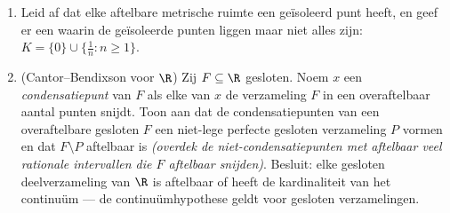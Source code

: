 \begin{problem}
\begin{enumerate}[resume]
        perfectheid.
  \item Leid af dat elke aftelbare  metrische ruimte een
        geïsoleerd punt heeft, en geef er een waarin de
        geïsoleerde punten  liggen maar niet alles zijn: $K =
        \{0\} \cup \{\frac1n : n \geq 1\}$.
  \item (Cantor--Bendixson voor $\R$) Zij $F \subseteq \R$
        gesloten. Noem $x$ een \emph{condensatiepunt} van $F$ als
        elke  van $x$ de verzameling $F$ in een
        overaftelbaar aantal punten snijdt. Toon aan dat de
        condensatiepunten van een overaftelbare gesloten $F$ een
        niet-lege perfecte gesloten verzameling $P$ vormen en dat
        $F \setminus P$ aftelbaar is \emph{(overdek de
        niet-condensatiepunten met aftelbaar veel rationale
        intervallen die $F$ aftelbaar snijden)}. Besluit: elke
        gesloten deelverzameling van $\R$ is aftelbaar of heeft de
        kardinaliteit van het continuüm --- de continuümhypothese
        geldt voor gesloten verzamelingen.
\end{enumerate}


\end{problem}
